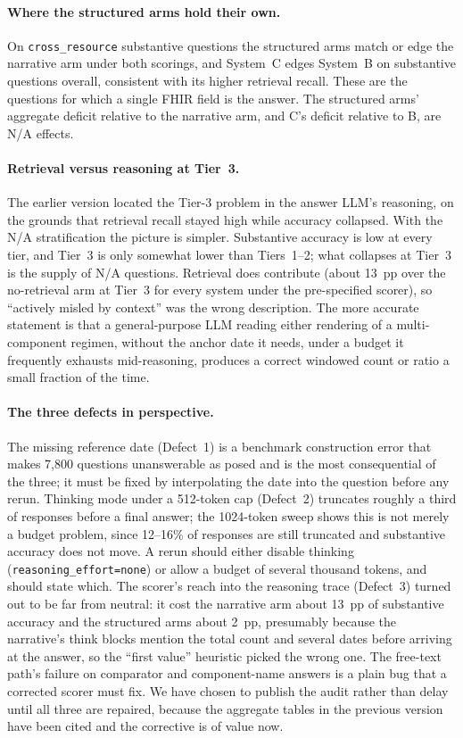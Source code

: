 \paragraph{Where the structured arms hold their own.}
On \texttt{cross\_resource} substantive questions the structured arms match or edge the
narrative arm under both scorings, and System~C edges System~B on substantive questions
overall, consistent with its higher retrieval recall.  These are the questions for which a
single FHIR field is the answer.  The structured arms' aggregate deficit relative to the
narrative arm, and C's deficit relative to B, are N/A effects.

\paragraph{Retrieval versus reasoning at Tier~3.}
The earlier version located the Tier-3 problem in the answer LLM's reasoning, on the
grounds that retrieval recall stayed high while accuracy collapsed.  With the N/A
stratification the picture is simpler.  Substantive accuracy is low at every tier, and
Tier~3 is only somewhat lower than Tiers~1--2; what collapses at Tier~3 is the supply of
N/A questions.  Retrieval does contribute (about 13~pp over the no-retrieval arm at Tier~3
for every system under the pre-specified scorer), so ``actively misled by context'' was
the wrong description.  The more accurate statement is that a general-purpose LLM reading
either rendering of a multi-component regimen, without the anchor date it needs, under a
budget it frequently exhausts mid-reasoning, produces a correct windowed count or ratio a
small fraction of the time.

\paragraph{The three defects in perspective.}
The missing reference date (Defect~1) is a benchmark construction error that makes 7,800
questions unanswerable as posed and is the most consequential of the three; it must be
fixed by interpolating the date into the question before any rerun.  Thinking mode under
a 512-token cap (Defect~2) truncates roughly a third of responses before a final answer;
the 1024-token sweep shows this is not merely a budget problem, since 12--16\% of
responses are still truncated and substantive accuracy does not move.  A rerun should
either disable thinking (\texttt{reasoning\_effort=none}) or allow a budget of several
thousand tokens, and should state which.  The scorer's reach into the reasoning trace
(Defect~3) turned out to be far from neutral: it cost the narrative arm about 13~pp of
substantive accuracy and the structured arms about 2~pp, presumably because the
narrative's think blocks mention the total count and several dates before arriving at the
answer, so the ``first value'' heuristic picked the wrong one.  The free-text path's
failure on comparator and component-name answers is a plain bug that a corrected scorer
must fix.  We have chosen to publish the audit rather than delay until all three are
repaired, because the aggregate tables in the previous version have been cited and the
corrective is of value now.


